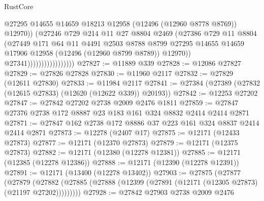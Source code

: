 \begin{lexlean}{RustCore}
\begin{coremodule}
                                        @27295
                                        @14655
                                        @14659
                                        @18213
                                        @12958
                                        (@12496 (@12960 @8778 @8769))
                                        @12970))
                                    (@27246
                                      @729
                                      @214
                                      @11
                                      @27
                                      @8804
                                      @2469
                                      (@27386
                                        @729
                                        @11
                                        @8804
                                        (@27449
                                          @171
                                          @64
                                          @11
                                          @4491
                                          @2503
                                          @8788
                                          @8799
                                          @27295
                                          @14655
                                          @14659
                                          @17906
                                          @12958
                                          (@12496 (@12960 @8799 @8789))
                                          @12970))
                                      @27341)))))))))))))))))
@27827 := @11889 @339
@27828 := @12086 @27827
@27829 := @27826 @27828
@27830 := @11960 @2117
@27832 := @27829 (@12611 @27830)
@27833 := @11984 @2117
@27841 := @27384 (@27389 (@27832 (@12615 @27833) (@12620 (@12622 @339)) @20193))
@27842 := @12253 @27202
@27847 := @27842 @27202 @2738 @2009 @2476 @1811
@27859 := @27847 @27376 @2738 @172 @8887 @23 @183 @161 @324 @8832 @2414 @2414 @2871
@27871 := @27847 @162 @2738 @172 @8886 @37 @223 @161 @324 @8837 @2414 @2414 @2871
@27873 := @12278 (@2407 @17)
@27875 := @12171 (@12433 @27873)
@27877 := @12171 (@12370 @27873)
@27879 := @12171 (@12375 @27873)
@27882 := @12171 (@12380 (@12278 @12381))
@27885 := @12171 (@12385 (@12278 @12386))
@27888 := @12171 (@12390 (@12278 @12391))
@27891 := @12171 (@13400 (@12278 @13402))
@27903 := @27875
    (@27877
      (@27879
        (@27882 (@27885 (@27888 (@12399 (@27891 (@12171 (@12305 @27873) (@21197 @27202)))))))))
@27928 := @27842
    @27903
    @2738
    @2009
    @2476

\end{coremodule}
\end{lexlean}
